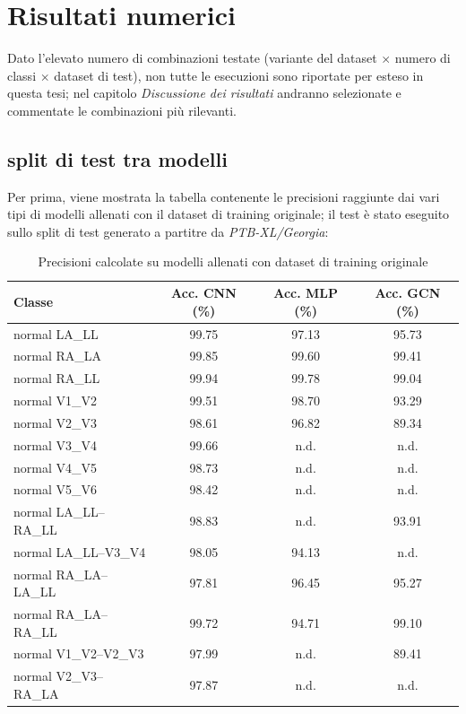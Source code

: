 \section{Risultati numerici}
\label{sec:dove-risultati}

Dato l'elevato numero di combinazioni testate (variante del dataset $\times$ numero di classi $\times$ dataset di test), non tutte le esecuzioni sono riportate per esteso in questa tesi; nel capitolo \emph{Discussione dei risultati} andranno selezionate e commentate le combinazioni più rilevanti.

\subsection{split di test tra modelli}
Per prima, viene mostrata la tabella contenente le precisioni raggiunte dai vari tipi di modelli allenati con il dataset di training originale; il test è stato eseguito sullo split di test generato a partitre da \emph{PTB-XL/Georgia}:

\begin{table}[htbp]
	\centering
	\caption{Precisioni calcolate su modelli allenati con dataset di training originale}
	\label{tab:model_confront}
	\begin{tabular}{lccc}
		\toprule
		Classe & Acc. CNN (\%) & Acc. MLP (\%) & Acc. GCN (\%) \\
		\midrule
		normal LA\_LL & 99.75 & 97.13 & 95.73 \\
		normal RA\_LA & 99.85 & 99.60 & 99.41 \\
		normal RA\_LL & 99.94 & 99.78 & 99.04 \\
		normal V1\_V2 & 99.51 & 98.70 & 93.29 \\
		normal V2\_V3 & 98.61 & 96.82 & 89.34 \\
		normal V3\_V4 & 99.66 & n.d. & n.d. \\
		normal V4\_V5 & 98.73 & n.d. & n.d. \\
		normal V5\_V6 & 98.42 & n.d. & n.d. \\
		normal LA\_LL--RA\_LL & 98.83 & n.d. & 93.91 \\
		normal LA\_LL--V3\_V4 & 98.05 & 94.13 & n.d. \\
		normal RA\_LA--LA\_LL & 97.81 & 96.45 & 95.27 \\
		normal RA\_LA--RA\_LL & 99.72 & 94.71 & 99.10 \\
		normal V1\_V2--V2\_V3 & 97.99 & n.d. & 89.41 \\
		normal V2\_V3--RA\_LA & 97.87 & n.d. & n.d. \\
		
		\bottomrule
	\end{tabular}
\end{table}

